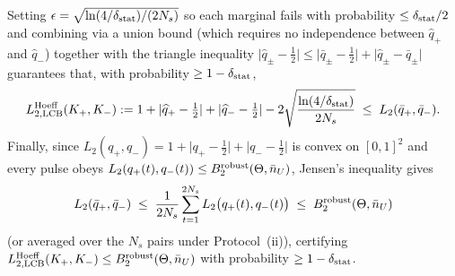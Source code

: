 \documentclass{iopjournal}
\newcommand{\nU}{\bar n_U}
\newcommand{\abs}[1]{\lvert #1\rvert}
\begin{document}
Setting $\epsilon = \sqrt{\ln(4/\delta_{\rm stat})/(2N_s)}$ so each marginal fails with probability $\le \delta_{\rm stat}/2$ and combining via a union bound (which requires no independence between $\widehat q_+$ and $\widehat q_-$) together with the triangle inequality $\abs{\widehat q_\pm - \frac{1}{2}} \le \abs{\bar q_\pm - \frac{1}{2}} + \abs{\widehat q_\pm - \bar q_\pm}$ guarantees that, with probability $\ge 1 - \delta_{\rm stat}$,
\begin{equation*}
L_{2,\rm LCB}^{\rm Hoeff}(K_+,K_-) := 1 + \abs{\widehat q_+ - \tfrac{1}{2}} + \abs{\widehat q_- - \tfrac{1}{2}} - 2\sqrt{\frac{\ln(4/\delta_{\rm stat})}{2N_s}} \;\le\; L_2(\bar q_+,\bar q_-).
\end{equation*}
Finally, since $L_2(q_+,q_-) = 1 + \abs{q_+ - \frac{1}{2}} + \abs{q_- - \frac{1}{2}}$ is convex on $[0,1]^2$ and every pulse obeys $L_2(q_+(t),q_-(t)) \le B_2^{\rm robust}(\Theta,\nU)$, Jensen's inequality gives
\begin{equation*}
L_2(\bar q_+,\bar q_-) \;\le\; \frac{1}{2N_s}\sum_{t=1}^{2N_s} L_2\bigl(q_+(t),q_-(t)\bigr) \;\le\; B_2^{\rm robust}(\Theta,\nU)
\end{equation*}
(or averaged over the $N_s$ pairs under Protocol~(ii)), certifying $L_{2,\rm LCB}^{\rm Hoeff}(K_+,K_-) \le B_2^{\rm robust}(\Theta,\nU)$ with probability $\ge 1 - \delta_{\rm stat}$.

\clearpage


\end{document}
